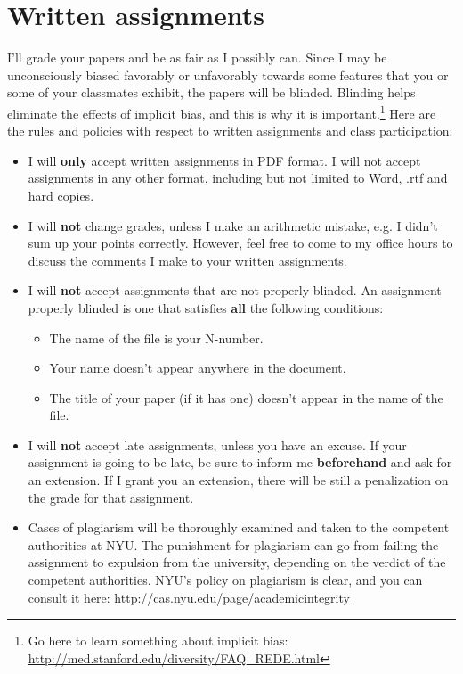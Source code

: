 \documentclass[11pt]{article}
\begin{document}
\section{Written assignments}
I'll grade your papers and be as fair as I possibly can. Since I may be unconsciously biased favorably or unfavorably towards some features that you or some of your classmates exhibit, the papers will be blinded. Blinding helps eliminate the effects of implicit bias, and this is why it is important.\footnote{Go here to learn something about implicit bias: \url{http://med.stanford.edu/diversity/FAQ_REDE.html}} Here are the rules and policies with respect to written assignments and class participation:
\begin{itemize}
\item I will \textbf{only} accept written assignments in PDF format. I will not accept assignments in any other format, including but not limited to Word, .rtf and hard copies.
\item I will \textbf{not} change grades, unless I make an arithmetic mistake, e.g. I didn't sum up your points correctly. However, feel free to come to my office hours to discuss the comments I make to your written assignments.
\item I will \textbf{not} accept assignments that are not properly blinded. An assignment properly blinded is one that satisfies \textbf{all} the following conditions:
	\begin{itemize}
	\item The name of the file is your N-number.
	\item Your name doesn't appear anywhere in the document.
	\item The title of your paper (if it has one) doesn't appear in the name of the file.
	\end{itemize}
\item I will \textbf{not} accept late assignments, unless you have an excuse. If your assignment is going to be late, be sure to inform me \textbf{beforehand} and ask for an extension. If I grant you an extension, there will be still a penalization on the grade for that assignment.
\item Cases of plagiarism will be thoroughly examined and taken to the competent authorities at NYU. The punishment for plagiarism can go from failing the assignment to expulsion from the university, depending on the verdict of the competent authorities. NYU's policy on plagiarism is clear, and you can consult it here: \url{http://cas.nyu.edu/page/academicintegrity}
\end{itemize}


\end{document}
